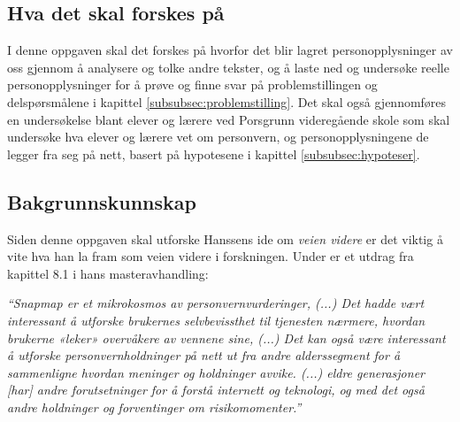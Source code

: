 \subsection{Hva det skal forskes på}
I denne oppgaven skal det forskes på hvorfor det blir lagret personopplysninger av oss gjennom å analysere og tolke andre tekster, og å laste ned og undersøke reelle personopplysninger for å prøve og finne svar på problemstillingen og delspørsmålene i kapittel \ref{subsubsec:problemstilling}. Det skal også gjennomføres en undersøkelse blant elever og lærere ved Porsgrunn videregående skole som skal undersøke hva elever og lærere vet om personvern, og personopplysningene de legger fra seg på nett, basert på hypotesene i kapittel \ref{subsubsec:hypoteser}.

\subsection{Bakgrunnskunnskap}
Siden denne oppgaven skal utforske Hanssens ide om \textit{veien videre} er det viktig å vite hva han la fram som veien videre i forskningen. Under er et utdrag fra kapittel 8.1 i hans masteravhandling:

\textit{``Snapmap er et mikrokosmos av personvernvurderinger, (...) Det hadde vært interessant å utforske brukernes selvbevissthet til tjenesten nærmere, hvordan brukerne «leker» overvåkere av vennene sine, (...) Det kan også være interessant å utforske personvernholdninger på nett ut fra andre alderssegment for å sammenligne hvordan meninger og holdninger avvike. (...) eldre generasjoner [har] andre forutsetninger for å forstå internett og teknologi, og med det også andre holdninger og forventinger om risikomomenter.''} \parencite[69]{master:hanssen}

\newpage